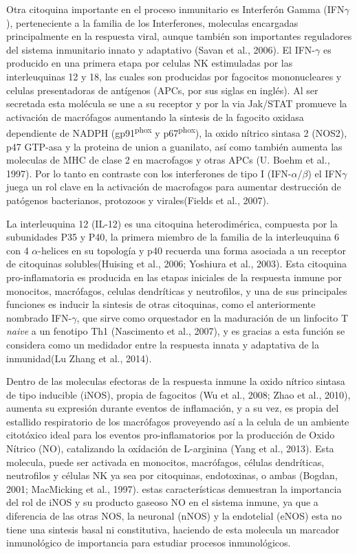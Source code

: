 \documentclass[12pt,a4paper,]{article}
\begin{document}
Otra citoquina importante en el proceso inmunitario es Interferón Gamma
(IFN$\gamma$), perteneciente a la familia de los Interferones, moleculas
encargadas principalmente en la respuesta viral, aunque también son
importantes reguladores del sistema inmunitario innato y adaptativo
(Savan et al., 2006). El IFN-$\gamma$ es producido en una primera etapa
por celulas NK estimuladas por las interleuquinas 12 y 18, las cuales
son producidas por fagocitos mononucleares y celulas presentadoras de
antígenos (APCs, por sus siglas en inglés). Al ser secretada esta
molécula se une a su receptor y por la via Jak/STAT promueve la
activación de macrófagos aumentando la sintesis de la fagocito oxidasa
dependiente de NADPH (gp91\textsuperscript{phox} y
p67\textsuperscript{phox}), la oxido nítrico sintasa 2 (NOS2), p47
GTP-asa y la proteina de union a guanilato, así como también aumenta las
moleculas de MHC de clase 2 en macrofagos y otras APCs (U. Boehm et al.,
1997). Por lo tanto en contraste con los interferones de tipo I
(IFN-$\alpha$/$\beta$) el IFN$\gamma$ juega un rol clave en la
activación de macrofagos para aumentar destrucción de patógenos
bacterianos, protozoos y virales(Fields et al., 2007).

La interleuquina 12 (IL-12) es una citoquina heterodimérica, compuesta
por la subunidades P35 y P40, la primera miembro de la familia de la
interleuquina 6 con 4 $\alpha$-helices en su topología y p40 recuerda
una forma asociada a un receptor de citoquinas solubles(Huising et al.,
2006; Yoshiura et al., 2003). Esta citoquina pro-inflamatoria es
producida en las etapas iniciales de la respuesta inmune por monocitos,
macrófagos, celulas dendríticas y neutrofilos, y una de sus principales
funciones es inducir la sintesis de otras citoquinas, como el
anteriormente nombrado IFN-$\gamma$, que sirve como orquestador en la
maduración de un linfocito T \emph{naive} a un fenotipo Th1 (Nascimento
et al., 2007), y es gracias a esta función se considera como un
medidador entre la respuesta innata y adaptativa de la inmunidad(Lu
Zhang et al., 2014).

Dentro de las moleculas efectoras de la respuesta inmune la oxido
nítrico sintasa de tipo inducible (iNOS), propia de fagocitos (Wu et
al., 2008; Zhao et al., 2010), aumenta su expresión durante eventos de
inflamación, y a su vez, es propia del estallido respiratorio de los
macrófagos proveyendo así a la celula de un ambiente citotóxico ideal
para los eventos pro-inflamatorios por la producción de Oxido Nítrico
(NO), catalizando la oxídación de L-arginina (Yang et al., 2013). Esta
molecula, puede ser activada en monocitos, macrófagos, células
dendríticas, neutrofilos y células NK ya sea por citoquinas,
endotoxinas, o ambas (Bogdan, 2001; MacMicking et al., 1997). estas
características demuestran la importancia del rol de iNOS y su producto
gaseoso NO en el sistema inmune, ya que a diferencia de las otras NOS,
la neuronal (nNOS) y la endotelial (eNOS) esta no tiene una sintesis
basal ni constitutiva, haciendo de esta molecula un marcador
inmunológico de importancia para estudiar procesos inmunológicos.
\end{document}

